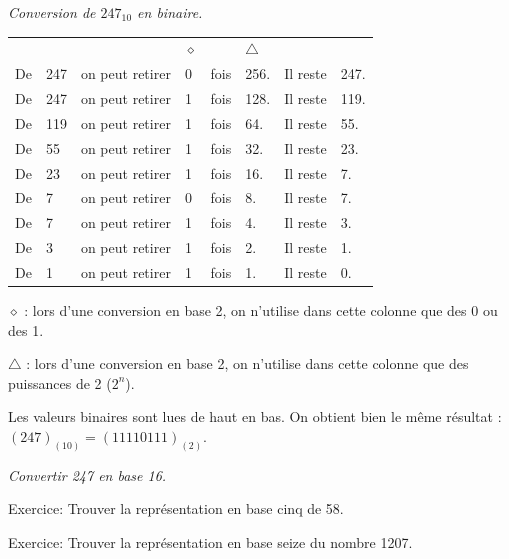 \documentclass[10pt,fleqn]{article} %
\begin{document}
\begin{exemple}
\textit{Conversion de $247_{10}$ en binaire.}

\begin{center}
\begin{tabular}{llllllll}
 & & & $\diamond$ & & $\triangle$ & & \\
De & 247 & on peut retirer & 0 & fois & 256. &Il reste & 247. \\
De & 247 & on peut retirer & 1 & fois & 128. &Il reste & 119. \\
De & 119 & on peut retirer & 1 & fois & 64. &Il reste & 55. \\
De & 55 & on peut retirer & 1 & fois & 32. &Il reste & 23. \\
De & 23 & on peut retirer & 1 & fois & 16. &Il reste & 7. \\
De & 7 & on peut retirer & 0 & fois & 8. &Il reste & 7. \\
De & 7 & on peut retirer & 1 & fois & 4. &Il reste & 3. \\
De & 3 & on peut retirer & 1 & fois & 2. &Il reste & 1. \\
De & 1 & on peut retirer & 1 & fois & 1. &Il reste & 0. \\
\end{tabular}
\end{center}

$\diamond$ : lors d'une conversion en base 2, on n'utilise dans cette colonne que des 0 ou des 1. 

$\triangle$ : lors d'une conversion en base 2, on n'utilise dans cette colonne que des puissances de 2 ($2^n$).

Les valeurs binaires sont lues de haut en bas. On obtient bien le même résultat : $(247)_{(10)}=(11110111)_{(2)}$.

\textit{Convertir 247 en base 16.}

\vspace{3cm}

\end{exemple}


\begin{exemple}
Exercice: Trouver la représentation en base cinq de 58.
\end{exemple}



\begin{exemple}
Exercice: Trouver la représentation en base seize du nombre 1207.
\end{exemple}
\end{document}
